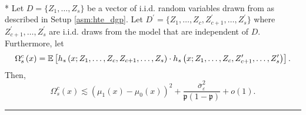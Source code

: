\newpage
\begin{lem}\label{lem:CATE_omega_sc}\mbox{}\\*
	Let $D = \{Z_1, \dotsc, Z_{s}\}$ be a vector of i.i.d. random variables drawn from as described in Setup \ref{asm:hte_dgp}.
	Let $D^{\prime} = \{Z_1, \dotsc, Z_{c}, Z_{c+1}^{\prime}, \dotsc,  Z_{s}^{\prime}\}$ where $Z_{c+1}^{\prime}, \dotsc,  Z_{s}^{\prime}$ are i.i.d. draws from the model that are independent of $D$.
	Furthermore, let
	\begin{equation}
		\Omega_{s}^{c}\left(x\right)
		= \mathbb{E}\left[h_{s}\left(x; Z_1, \ldots, Z_{c}, Z_{c+1}, \ldots, Z_{s}\right) \cdot
			h_{s}\left(x; Z_1, \ldots,Z_{c}, Z_{c+1}^{\prime}, \ldots, Z_{s}^{\prime}\right)\right].
	\end{equation}
	Then,
	\begin{equation}
		\Omega_{s}^{c}\left(x\right)
		\lesssim \left(\mu_{1}\left(x\right) - \mu_{0}\left(x\right)\right)^2
		+ \frac{\overline{\sigma}^2_{\varepsilon}}{\mathfrak{p}\left(1 - \mathfrak{p}\right)} + o(1).
	\end{equation}
\end{lem}
\hrule
